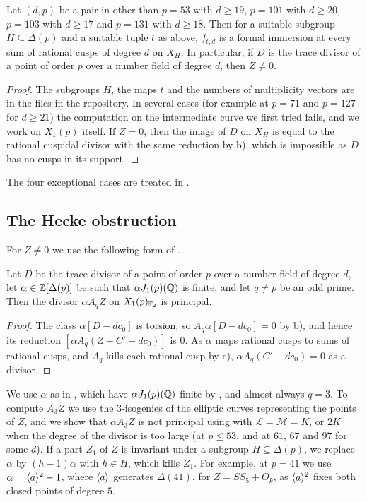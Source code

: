 \begin{proposition}\label{prop:cusps}
Let $(d,p)$ be a pair in  other than $p=53$ with $d\geq 19$, $p=101$ with $d\geq 20$, $p=103$ with $d\geq17$ and $p=131$ with $d\geq18$. Then for a suitable subgroup $H\subseteq\Delta(p)$ and a suitable tuple $t$ as above, $f_{t,d}$ is a formal immersion at every sum of rational cusps of degree $d$ on $X_H$. In particular, if $D$ is the trace divisor of a point of order $p$ over a number field of degree $d$, then $Z\neq0$.
\end{proposition}

\begin{proof}
The subgroups $H$, the maps $t$ and the numbers of multiplicity vectors are in the files  in the repository. In several cases (for example at $p=71$ and $p=127$ for $d\geq21$) the computation on the intermediate curve we first tried fails, and we work on $X_1(p)$ itself. If $Z=0$, then the image of $D$ on $X_H$ is equal to the rational cuspidal divisor with the same reduction by  b), which is impossible as $D$ has no cusps in its support.
\end{proof}

The four exceptional cases are treated in .

\subsection{The Hecke obstruction}
For $Z\neq0$ we use the following form of \cite[Lemma 8.6]{DKSS}.

\begin{lemma}\label{lem:hecke}
Let $D$ be the trace divisor of a point of order $p$ over a number field of degree $d$, let $\alpha\in\mathbb{Z}[\Delta(p)]$ be such that $\alpha J_1(p)(\mathbb{Q})$ is finite, and let $q\neq p$ be an odd prime. Then the divisor $\alpha A_qZ$ on $X_1(p)_{\mathbb{F}_2}$ is principal.
\end{lemma}

\begin{proof}
The class $\alpha[D-dc_0]$ is torsion, so $A_q\alpha[D-dc_0]=0$ by  b), and hence its reduction $[\alpha A_q(Z+C'-dc_0)]$ is $0$. As $\alpha$ maps rational cusps to sums of rational cusps, and $A_q$ kills each rational cusp by  c), $\alpha A_q(C'-dc_0)=0$ as a divisor.
\end{proof}

We use $\alpha$ as in , which have $\alpha J_1(p)(\mathbb{Q})$ finite by , and almost always $q=3$. To compute $A_3Z$ we use the $3$-isogenies of the elliptic curves representing the points of $Z$, and we show that $\alpha A_3Z$ is not principal using  with $\mathcal L=\mathcal M=K$, or $2K$ when the degree of the divisor is too large (at $p\leq 53$, and at $61$, $67$ and $97$ for some $d$). If a part $Z_1$ of $Z$ is invariant under a subgroup $H\subseteq\Delta(p)$, we replace $\alpha$ by $(h-1)\alpha$ with $h\in H$, which kills $Z_1$. For example, at $p=41$ we use $\alpha=\langle a\rangle^2-1$, where $\langle a\rangle$ generates $\Delta(41)$, for $Z=SS_5+O_k$, as $\langle a\rangle^2$ fixes both closed points of degree $5$.

